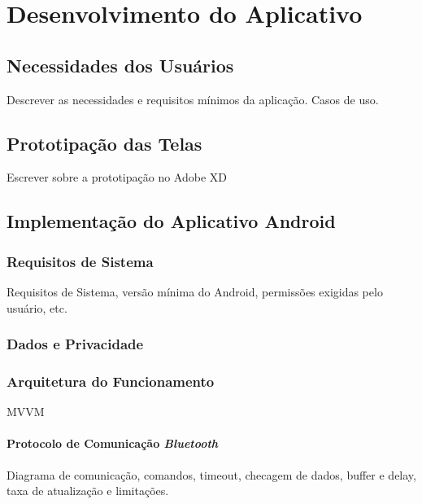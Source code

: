 \chapter{Desenvolvimento do Aplicativo}

\section{Necessidades dos Usuários}

Descrever as necessidades e requisitos mínimos da aplicação. Casos de uso.



\section{Prototipação das Telas}

Escrever sobre a prototipação no Adobe XD

\section{Implementação do Aplicativo Android}

\subsection{Requisitos de Sistema}

Requisitos de Sistema, versão mínima do Android, permissões exigidas pelo usuário, etc.

\subsection{Dados e Privacidade}

\subsection{Arquitetura do Funcionamento}

MVVM


\subsubsection{Protocolo de Comunicação \textit{Bluetooth}}

Diagrama de comunicação, comandos, timeout, checagem de dados, buffer e delay, taxa de atualização e limitações.